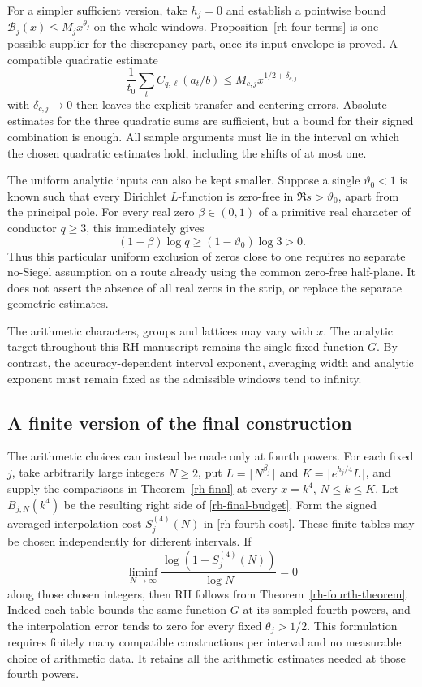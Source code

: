 For a simpler sufficient version, take $h_j=0$ and establish a
pointwise bound $\mathcal B_j(x)\le M_jx^{\theta_j}$ on the whole
windows. Proposition~\ref{rh-four-terms} is one possible supplier
for the discrepancy part, once its input envelope is proved.
A compatible quadratic estimate
\[
 \frac1{t_0}\sum_tC_{q,\ell}(a_t/b)
                           \le M_{c,j}x^{1/2+\delta_{c,j}}
\]
with $\delta_{c,j}\to0$ then leaves the explicit transfer and
centering errors. Absolute estimates for the three quadratic sums
are sufficient, but a bound for their signed combination is enough.
All sample arguments must lie in the interval on which the chosen
quadratic estimates hold, including the shifts of at most one.

The uniform analytic inputs can also be kept smaller. Suppose a single
$\vartheta_0<1$ is known such that every Dirichlet $L$-function is
zero-free in $\Re s>\vartheta_0$, apart from the principal pole.
For every real zero $\beta\in(0,1)$ of a primitive real character of
conductor $q\ge3$, this immediately gives
\[
 (1-\beta)\log q\ge(1-\vartheta_0)\log3>0.
\]
Thus this particular uniform exclusion of zeros close to one requires
no separate no-Siegel assumption on a route already using the common
zero-free half-plane. It does not assert the absence of all real
zeros in the strip, or replace the separate geometric estimates.

The arithmetic characters, groups and lattices may vary with $x$.
The analytic target throughout this RH manuscript remains the single
fixed function $G$. By contrast, the accuracy-dependent interval
exponent, averaging width and analytic exponent must remain fixed
as the admissible windows tend to infinity.

\subsection{A finite version of the final construction}

The arithmetic choices can instead be made only at fourth powers. For each
fixed $j$, take arbitrarily large integers $N\ge2$, put
$L=\lceil N^{\beta_j}\rceil$ and $K=\lceil e^{h_j/4}L\rceil$,
and supply the comparisons in Theorem~\ref{rh-final} at every
$x=k^4$, $N\le k\le K$. Let $B_{j,N}(k^4)$ be the resulting right
side of \eqref{rh-final-budget}. Form the signed averaged interpolation
cost $S_j^{(4)}(N)$ in \eqref{rh-fourth-cost}. These finite tables may
be chosen independently for different intervals. If
\[
 \liminf_{N\to\infty}
 \frac{\log(1+S_j^{(4)}(N))}{\log N}=0
\]
along those chosen integers, then RH follows from
Theorem~\ref{rh-fourth-theorem}. Indeed each table bounds the same
function $G$ at its sampled fourth powers, and the interpolation error
tends to zero for every fixed $\theta_j>1/2$.
This formulation requires finitely many compatible constructions per
interval and no measurable choice of arithmetic data. It retains all
the arithmetic estimates needed at those fourth powers.

